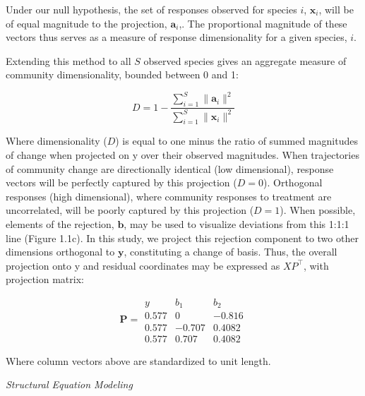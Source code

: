 \documentclass[twoside,12pt,final]{ucthesis-CA2012}
\begin{document}
\begin{ucmainmatter}
Under our null hypothesis, the set of responses observed for species \(i\), \(\mathbf{x}_i\), will be of equal magnitude to the projection, \(\mathbf{a}_i\),. The proportional magnitude of these vectors thus serves as a measure of response dimensionality for a given species, \(i\).

Extending this method to all \(S\) observed species gives an aggregate measure of community dimensionality, bounded between 0 and 1:

\[D = 1 - \frac{\sum_{i = 1}^{S}\|\mathbf{a}_i\|^2}{\sum_{i = 1}^{S}\|\mathbf{x}_i\|^2}\]

Where dimensionality (\(D\)) is equal to one minus the ratio of summed magnitudes of change when projected on y over their observed magnitudes. When trajectories of community change are directionally identical (low dimensional), response vectors will be perfectly captured by this projection (\(D = 0\)). Orthogonal responses (high dimensional), where community responses to treatment are uncorrelated, will be poorly captured by this projection (\(D = 1\)).
When possible, elements of the rejection, \(\mathbf{b}\), may be used to visualize deviations from this 1:1:1 line (Figure 1.1c). In this study, we project this rejection component to two other dimensions orthogonal to \(\mathbf{y}\), constituting a change of basis. Thus, the overall projection onto y and residual coordinates may be expressed as \(XP^\top\), with projection matrix:

\[
\mathbf{P} = 
\begin{matrix}
y & b_1 & b_2 \\
\hline
0.577 & 0 & -0.816 \\
0.577 & -0.707 & 0.4082 \\
0.577 & 0.707 & 0.4082 
\end{matrix}
\]

Where column vectors above are standardized to unit length.

\emph{Structural Equation Modeling}


\end{ucmainmatter}
\end{document}
